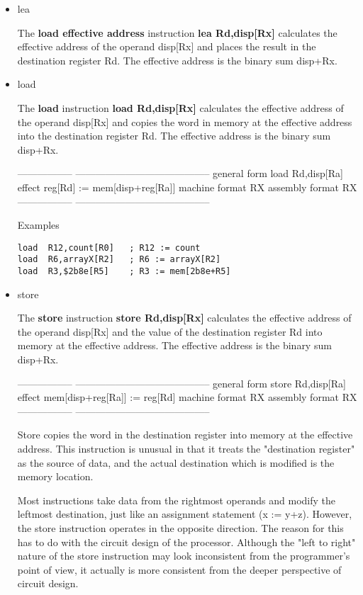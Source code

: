 \documentclass[11pt]{article}
\begin{document}
\begin{itemize}
\item lea
\label{sec:org2fe4a40}

The \textbf{\textbf{load effective address}} instruction \textbf{lea Rd,disp[Rx]} calculates
the effective address of the operand disp[Rx] and places the result in
the destination register Rd.  The effective address is the binary sum
disp+Rx.

\item load
\label{sec:org242f49d}

The \textbf{\textbf{load}} instruction \textbf{load Rd,disp[Rx]} calculates the effective
address of the operand disp[Rx] and copies the word in memory at the
effective address into the destination register Rd.  The effective
address is the binary sum disp+Rx.

-----------------   -----------------------------------------
general form        load Rd,disp[Ra]
effect              reg[Rd] := mem[disp+reg[Ra]]
machine format      RX
assembly format     RX
-----------------   -----------------------------------------

Examples
\begin{verbatim}
load  R12,count[R0]   ; R12 := count
load  R6,arrayX[R2]   ; R6 := arrayX[R2]
load  R3,$2b8e[R5]    ; R3 := mem[2b8e+R5]
\end{verbatim}

\item store
\label{sec:org5e01f75}

The \textbf{\textbf{store}} instruction \textbf{store Rd,disp[Rx]} calculates the effective
address of the operand disp[Rx] and the value of the destination
register Rd into memory at the effective address.  The effective
address is the binary sum disp+Rx.

-----------------   -----------------------------------------
general form        store Rd,disp[Ra]
effect              mem[disp+reg[Ra]] := reg[Rd]
machine format      RX
assembly format     RX
-----------------   -----------------------------------------

Store copies the word in the destination register into memory at the
effective address.  This instruction is unusual in that it treats the
"destination register" as the source of data, and the actual
destination which is modified is the memory location.

Most instructions take data from the rightmost operands and modify the
leftmost destination, just like an assignment statement (x := y+z).
However, the store instruction operates in the opposite direction.
The reason for this has to do with the circuit design of the
processor.  Although the "left to right" nature of the store
instruction may look inconsistent from the programmer's point of view,
it actually is more consistent from the deeper perspective of circuit
design.


\end{itemize}
\end{document}
